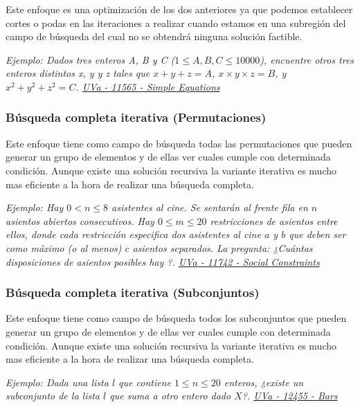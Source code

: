 Este enfoque es una optimización de los dos anteriores ya que podemos establecer cortes o podas en las iteraciones a realizar cuando estamos en una subregión del campo de búsqueda del cual no se obtendrá ninguna solución factible.

\emph{Ejemplo: Dados tres enteros A, B y C ($1 \le A, B, C \le 10 000$), encuentre otros tres enteros distintos x, y y z tales que $x + y + z = A$, $x \times y \times z = B$, y $x^2 + y^2 + z^2 = C$. \href{https://onlinejudge.org/index.php?option=onlinejudge&Itemid=8&page=show_problem&problem=2612}{UVa - 11565 - Simple Equations}}

\subsubsection{Búsqueda completa iterativa (Permutaciones)}

Este enfoque tiene como campo de búsqueda todas las permutaciones que pueden generar un grupo de elementos y de ellas ver cuales cumple con determinada condición. Aunque existe una solución recursiva la variante iterativa es mucho mas eficiente a la hora de realizar una búsqueda completa.

\emph{Ejemplo: Hay $0 < n \le 8$ asistentes al cine. Se sentarán al frente
	fila en $n$ asientos abiertos consecutivos. Hay $0 \le m \le 20$ restricciones de asientos entre ellos, donde cada restricción especifica dos asistentes al cine $a$ y $b$ que deben ser como máximo (o al menos) $c$ asientos separados. La pregunta: ¿Cuántas disposiciones de asientos posibles hay ?. \href{https://onlinejudge.org/index.php?option=onlinejudge&Itemid=8&page=show_problem&problem=2842}{UVa - 11742 - Social Constraints} }

\subsubsection{Búsqueda completa iterativa  (Subconjuntos)}

Este enfoque tiene como campo de búsqueda todos los subconjuntos que pueden generar un grupo de elementos y de ellas ver cuales cumple con determinada condición. Aunque existe una solución recursiva la variante iterativa es mucho mas eficiente a la hora de realizar una búsqueda completa.

\emph{Ejemplo: Dada una lista $l$ que contiene $1 \le n \le 20$ enteros, ¿existe un subconjunto de la lista $l$ que suma a otro entero dado $X$?. \href{https://onlinejudge.org/index.php?option=com_onlinejudge&Itemid=8&page=show_problem&category=24&problem=3886}{UVa - 12455 - Bars} }

